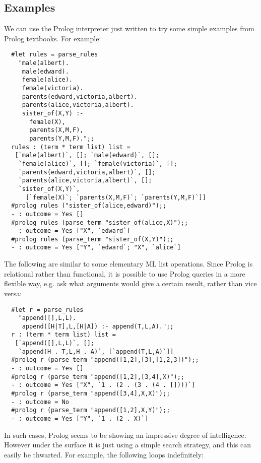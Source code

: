 \subsection{Examples}

We can use the Prolog interpreter just written to try some simple examples from
Prolog textbooks. For example:

\begin{boxed}\begin{verbatim}
  #let rules = parse_rules
    "male(albert).
     male(edward).
     female(alice).
     female(victoria).
     parents(edward,victoria,albert).
     parents(alice,victoria,albert).
     sister_of(X,Y) :-
       female(X),
       parents(X,M,F),
       parents(Y,M,F).";;
  rules : (term * term list) list =
   [`male(albert)`, []; `male(edward)`, [];
    `female(alice)`, []; `female(victoria)`, [];
    `parents(edward,victoria,albert)`, [];
    `parents(alice,victoria,albert)`, [];
    `sister_of(X,Y)`,
      [`female(X)`; `parents(X,M,F)`; `parents(Y,M,F)`]]
  #prolog rules ("sister_of(alice,edward)");;
  - : outcome = Yes []
  #prolog rules (parse_term "sister_of(alice,X)");;
  - : outcome = Yes ["X", `edward`]
  #prolog rules (parse_term "sister_of(X,Y)");;
  - : outcome = Yes ["Y", `edward`; "X", `alice`]
\end{verbatim}\end{boxed}

The following are similar to some elementary ML list operations. Since Prolog
is relational rather than functional, it is possible to use Prolog queries in a
more flexible way, e.g. ask what arguments would give a certain result, rather
than vice versa:

\begin{boxed}\begin{verbatim}
  #let r = parse_rules
    "append([],L,L).
     append([H|T],L,[H|A]) :- append(T,L,A).";;
  r : (term * term list) list =
   [`append([],L,L)`, [];
    `append(H . T,L,H . A)`, [`append(T,L,A)`]]
  #prolog r (parse_term "append([1,2],[3],[1,2,3])");;
  - : outcome = Yes []
  #prolog r (parse_term "append([1,2],[3,4],X)");;
  - : outcome = Yes ["X", `1 . (2 . (3 . (4 . [])))`]
  #prolog r (parse_term "append([3,4],X,X)");;
  - : outcome = No
  #prolog r (parse_term "append([1,2],X,Y)");;
  - : outcome = Yes ["Y", `1 . (2 . X)`]
\end{verbatim}\end{boxed}

In such cases, Prolog seems to be showing an impressive degree of intelligence.
However under the surface it is just using a simple search strategy, and this
can easily be thwarted. For example, the following loops indefinitely:

